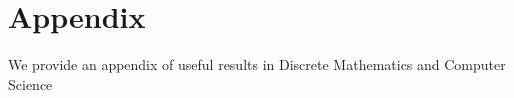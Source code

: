 \section{Appendix}
We provide an appendix of useful results in Discrete Mathematics and Computer Science